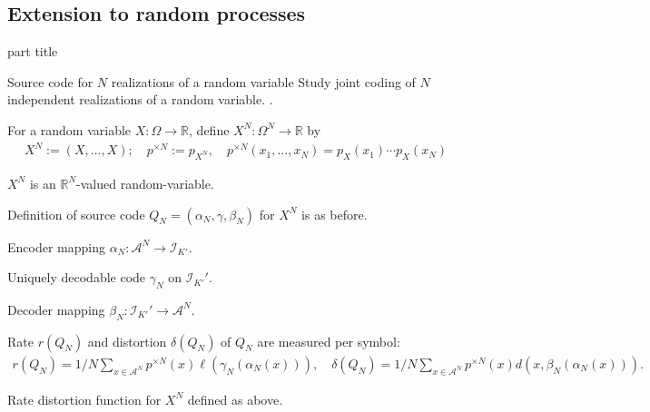 \subsection{Extension to random processes}
\begin{frame}
 \vspace{12.0ex}
\begin{center}
\begin{beamercolorbox}[sep=12pt,center]{part title}
\insertsubsection\par
\end{beamercolorbox}
\end{center}
\end{frame}

\begin{frame}{Source code for $N$ realizations of a random variable} 
 Study joint coding of $N$ independent realizations of a random variable. .
\bit
\item For a random variable $X:\Omega\rightarrow\mathbb{R}$, define $X^N:\Omega^N\rightarrow\mathbb{R}$ by 
\begin{align*}
X^N:=(X,\dots,X); \quad p^{\times N}:=p_{X^N},\quad  p^{\times N}(x_1,\dots,x_N)=p_X(x_1)\cdots p_X(x_N)
\end{align*}
\item $X^N$ is an $\mathbb{R}^N$-valued random-variable.  
\item Definition of source code $Q_N=(\alpha_N,\gamma,\beta_N)$  for $X^N$ is as before.
\bit
\item Encoder mapping $\alpha_N:\mathcal{A}^N\to \mathcal{I}_{K'}$.
\item Uniquely decodable code $\gamma_N$ on $\mathcal{I}_{K'}'$.
\item Decoder mapping $\beta_N:\mathcal{I}_{K'}'\to\mathcal{A}^N$. 
\eit
\item Rate $r(Q_N)$  and distortion $\delta(Q_N)$ of $Q_N$ are measured per symbol: 
\begin{align*}
r(Q_N)=1/N\sum_{x\in\mathcal{A}^N}p^{\times N}(x)\ell(\gamma_N(\alpha_N(x))), \quad \delta(Q_N)= 1/N\sum_{x\in\mathcal{A}^N}p^{\times N}(x)d(x,\beta_N(\alpha_N(x))).
\end{align*} 
\item[\iarrow] Rate distortion function for $X^N$ defined as above. 
\eit
\end{frame}


